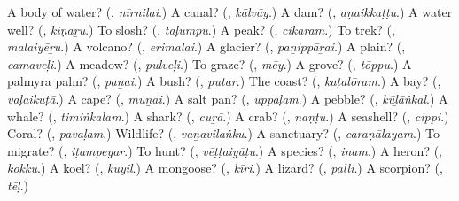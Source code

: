 \begin{tcolorbox}[breakable,colback=teal!4,colframe=teal!35!black,title={Before you move on}]
A body of water? (\textbf{}, \emph{nīrnilai}.) A canal? (\textbf{}, \emph{kālvāy}.) A dam? (\textbf{}, \emph{aṇaikkaṭṭu}.) A water well? (\textbf{}, \emph{kiṇaṟu}.) To slosh? (\textbf{}, \emph{taḷumpu}.) A peak? (\textbf{}, \emph{cikaram}.) To trek? (\textbf{}, \emph{malaiyēṟu}.) A volcano? (\textbf{}, \emph{erimalai}.) A glacier? (\textbf{}, \emph{paṉippāṟai}.) A plain? (\textbf{}, \emph{camaveḷi}.) A meadow? (\textbf{}, \emph{pulveḷi}.) To graze? (\textbf{}, \emph{mēy}.) A grove? (\textbf{}, \emph{tōppu}.) A palmyra palm? (\textbf{}, \emph{paṉai}.) A bush? (\textbf{}, \emph{putar}.) The coast? (\textbf{}, \emph{kaṭalōram}.) A bay? (\textbf{}, \emph{vaḷaikuṭā}.) A cape? (\textbf{}, \emph{muṉai}.) A salt pan? (\textbf{}, \emph{uppaḷam}.) A pebble? (\textbf{}, \emph{kūḻāṅkal}.) A whale? (\textbf{}, \emph{timiṅkalam}.) A shark? (\textbf{}, \emph{cuṟā}.) A crab? (\textbf{}, \emph{naṇṭu}.) A seashell? (\textbf{}, \emph{cippi}.) Coral? (\textbf{}, \emph{pavaḷam}.) Wildlife? (\textbf{}, \emph{vaṉavilaṅku}.) A sanctuary? (\textbf{}, \emph{caraṇālayam}.) To migrate? (\textbf{}, \emph{iṭampeyar}.) To hunt? (\textbf{}, \emph{vēṭṭaiyāṭu}.) A species? (\textbf{}, \emph{iṉam}.) A heron? (\textbf{}, \emph{kokku}.) A koel? (\textbf{}, \emph{kuyil}.) A mongoose? (\textbf{}, \emph{kīri}.) A lizard? (\textbf{}, \emph{palli}.) A scorpion? (\textbf{}, \emph{tēḷ}.)
\end{tcolorbox}
